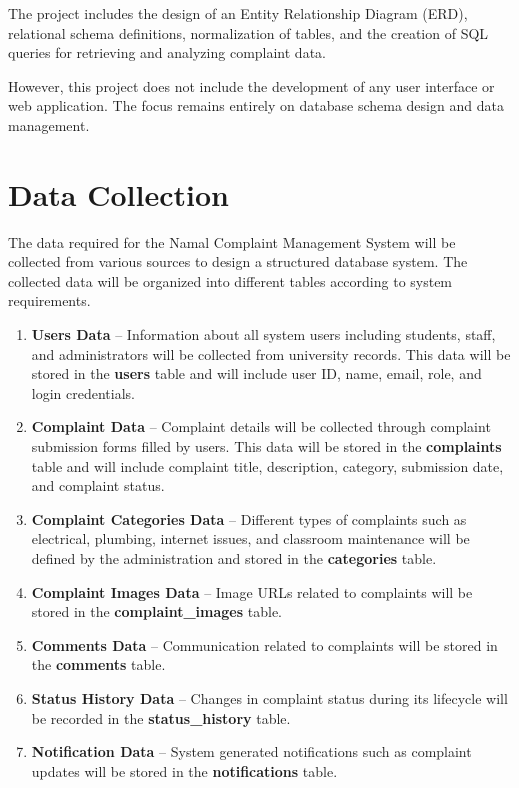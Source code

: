 \documentclass[12pt,a4paper]{article}
\begin{document}
The project includes the design of an Entity Relationship Diagram (ERD), relational schema definitions, normalization of tables, and the creation of SQL queries for retrieving and analyzing complaint data.

However, this project does not include the development of any user interface or web application. The focus remains entirely on database schema design and data management.


\section{Data Collection}

The data required for the Namal Complaint Management System will be collected from various sources to design a structured database system. The collected data will be organized into different tables according to system requirements.

\begin{enumerate}

\item \textbf{Users Data} – Information about all system users including students, staff, and administrators will be collected from university records. This data will be stored in the \textbf{users} table and will include user ID, name, email, role, and login credentials.

\item \textbf{Complaint Data} – Complaint details will be collected through complaint submission forms filled by users. This data will be stored in the \textbf{complaints} table and will include complaint title, description, category, submission date, and complaint status.

\item \textbf{Complaint Categories Data} – Different types of complaints such as electrical, plumbing, internet issues, and classroom maintenance will be defined by the administration and stored in the \textbf{categories} table.

\item \textbf{Complaint Images Data} – Image URLs related to complaints will be stored in the \textbf{complaint\_images} table.

\item \textbf{Comments Data} – Communication related to complaints will be stored in the \textbf{comments} table.

\item \textbf{Status History Data} – Changes in complaint status during its lifecycle will be recorded in the \textbf{status\_history} table.

\item \textbf{Notification Data} – System generated notifications such as complaint updates will be stored in the \textbf{notifications} table.

\end{enumerate}
\end{document}
